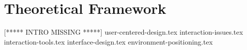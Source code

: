 \chapter{Theoretical Framework}
\label{theory}
[***** INTRO MISSING *****]
{user-centered-design.tex}
{interaction-issues.tex}
{interaction-tools.tex}
{interface-design.tex}
{environment-positioning.tex}
